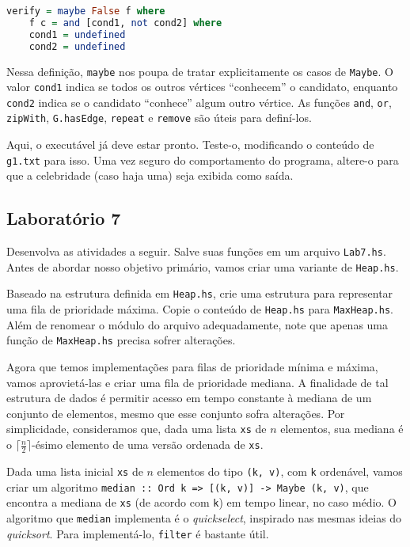 \documentclass[a4paper]{article}
\begin{document}
\begin{lstlisting}[language=haskell, frame=single]
verify = maybe False f where
	f c = and [cond1, not cond2] where
	cond1 = undefined
	cond2 = undefined
\end{lstlisting}

Nessa definição, \texttt{maybe} nos poupa de tratar explicitamente os casos de \texttt{Maybe}.
O valor \texttt{cond1} indica se todos os outros vértices ``conhecem'' o candidato, enquanto \texttt{cond2} indica se o candidato ``conhece'' algum outro vértice.
As funções \texttt{and}, \texttt{or}, \texttt{zipWith}, \texttt{G.hasEdge}, \texttt{repeat} e \texttt{remove} são úteis para definí-los.

Aqui, o executável já deve estar pronto.
Teste-o, modificando o conteúdo de \texttt{g1.txt} para isso.
Uma vez seguro do comportamento do programa, altere-o para que a celebridade (caso haja uma) seja exibida como saída.

\subsection{Laboratório 7}

Desenvolva as atividades a seguir.
Salve suas funções em um arquivo \texttt{Lab7.hs}.
Antes de abordar nosso objetivo primário, vamos criar uma variante de \texttt{Heap.hs}.

Baseado na estrutura definida em \texttt{Heap.hs}, crie uma estrutura para representar uma fila de prioridade máxima.
Copie o conteúdo de \texttt{Heap.hs} para \texttt{MaxHeap.hs}.
Além de renomear o módulo do arquivo adequadamente, note que apenas uma função de \texttt{MaxHeap.hs} precisa sofrer alterações.

Agora que temos implementações para filas de prioridade mínima e máxima, vamos aprovietá-las e criar uma fila de prioridade mediana.
A finalidade de tal estrutura de dados é permitir acesso em tempo constante à mediana de um conjunto de elementos, mesmo que esse conjunto sofra alterações.
Por simplicidade, consideramos que, dada uma lista \texttt{xs} de $n$ elementos, sua mediana é o $\lceil\frac{n}{2}\rceil$-ésimo elemento de uma versão ordenada de \texttt{xs}.

Dada uma lista inicial \texttt{xs} de $n$ elementos do tipo \texttt{(k, v)}, com \texttt{k} ordenável, vamos criar um algoritmo \mbox{\texttt{median :: Ord k => [(k, v)] -> Maybe (k, v)}}, que encontra a mediana de \texttt{xs} (de acordo com \texttt{k}) em tempo linear, no caso médio.
O algoritmo que \texttt{median} implementa é o \emph{quickselect}, inspirado nas mesmas ideias do \emph{quicksort}.
Para implementá-lo, \texttt{filter} é bastante útil.
\end{document}
